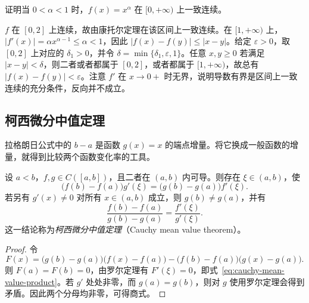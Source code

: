 \documentclass[UTF8,12pt,a4paper,fontset=fandol]{ctexbook}
\begin{document}
\begin{example}
\label{ex:power-function-uniform-continuity-by-mean-value}
证明当 $0<\alpha<1$ 时，$f(x)=x^\alpha$ 在 $[0,+\infty)$ 上一致连续。
\end{example}

\begin{solve}
$f$ 在 $[0,2]$ 上连续，故由康托尔定理在该区间上一致连续。在 $[1,+\infty)$ 上，$|f'(x)|=\alpha x^{\alpha-1}\leq\alpha<1$，因此 $|f(x)-f(y)|\leq|x-y|$。给定 $\varepsilon>0$，取 $[0,2]$ 上对应的 $\delta_1>0$，并令 $\delta=\min\{\delta_1,\varepsilon,1\}$。任意 $x,y\geq0$ 若满足 $|x-y|<\delta$，则二者或者都属于 $[0,2]$，或者都属于 $[1,+\infty)$，故总有 $|f(x)-f(y)|<\varepsilon$。注意 $f'$ 在 $x\to0+$ 时无界，说明导数有界是区间上一致连续的充分条件，反向并不成立。
\end{solve}

\subsection{柯西微分中值定理}
\label{subsec:cauchy-mean-value-theorem}

拉格朗日公式中的 $b-a$ 是函数 $g(x)=x$ 的端点增量。将它换成一般函数的增量，就得到比较两个函数变化率的工具。

\begin{theorem}[柯西微分中值定理]
\label{thm:cauchy-mean-value}
设 $a<b$，$f,g\in C([a,b])$，且二者在 $(a,b)$ 内可导。则存在 $\xi\in(a,b)$，使
\begin{equation}
    \bigl(f(b)-f(a)\bigr)g'(\xi)
    =\bigl(g(b)-g(a)\bigr)f'(\xi).
    \label{eq:cauchy-mean-value-product}
\end{equation}
若另有 $g'(x)\neq0$ 对所有 $x\in(a,b)$ 成立，则 $g(b)\neq g(a)$，并有
\begin{equation}
    \frac{f(b)-f(a)}{g(b)-g(a)}=\frac{f'(\xi)}{g'(\xi)}.
    \label{eq:cauchy-mean-value-quotient}
\end{equation}
这一结论称为\emph{柯西微分中值定理}（Cauchy mean value theorem）。
\end{theorem}

\begin{proof}
令
\[
    F(x)=\bigl(g(b)-g(a)\bigr)\bigl(f(x)-f(a)\bigr)
       -\bigl(f(b)-f(a)\bigr)\bigl(g(x)-g(a)\bigr).
\]
则 $F(a)=F(b)=0$，由罗尔定理有 $F'(\xi)=0$，即式~\eqref{eq:cauchy-mean-value-product}。若 $g'$ 处处非零，而 $g(a)=g(b)$，则对 $g$ 使用罗尔定理会得到矛盾。因此两个分母均非零，可得商式。
\end{proof}
\end{document}
